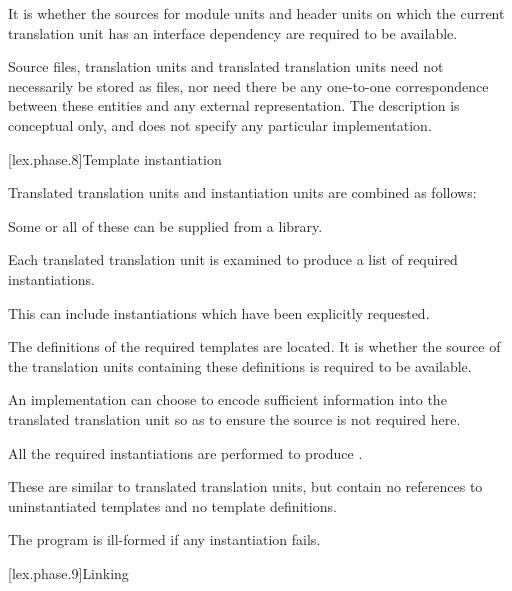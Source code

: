 \pnum
It is 
whether the sources for module units and header units
on which the current translation unit has an interface
dependency
are required to be available.
\begin{note}
Source files, translation
units and translated translation units need not necessarily be stored as
files, nor need there be any one-to-one correspondence between these
entities and any external representation. The description is conceptual
only, and does not specify any particular implementation.
\end{note}

[lex.phase.8]{Template instantiation}%

\pnum
Translated translation units and instantiation units are combined
as follows:
\begin{note}
Some or all of these can be supplied from a
library.
\end{note}

\pnum
Each translated translation unit is examined to
produce a list of required instantiations.
\begin{note}
This can include
instantiations which have been explicitly
requested.
\end{note}

\pnum
The definitions of the required templates are located.
It is  whether the
source of the translation units containing these definitions
is required to be available.
\begin{note}
An implementation can choose to encode sufficient
information into the translated translation unit so as to ensure the
source is not required here.
\end{note}

\pnum
All the required instantiations are performed
to produce .
\begin{note}
These are similar to translated translation units, but contain no references to
uninstantiated templates and no template definitions.
\end{note}

\pnum
The program is ill-formed if any instantiation fails.

[lex.phase.9]{Linking}%

